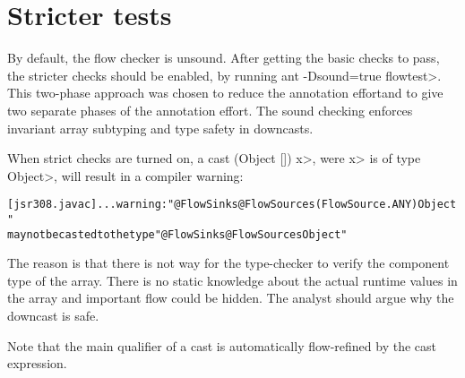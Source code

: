 %
%
%




\section{Stricter tests\label{sec:stricter}}

By default, the flow checker is unsound.  After getting the basic checks to pass, the
 stricter checks should be enabled, by running \<ant -Dsound=true flowtest>.
This two-phase approach was chosen to reduce
the annotation effortand to give two separate phases of
the annotation effort.
 The sound checking enforces invariant 
array subtyping and type safety in downcasts.


When strict checks are turned on,
a cast \<(Object []) x>, were \<x> is of type \<Object>, will result
in a compiler warning:

\begin{alltt}
[jsr308.javac] ... warning: "@FlowSinks @FlowSources({FlowSource.ANY}) Object"
       may not be casted to the type "@FlowSinks @FlowSources Object"
\end{alltt}

The reason is that there is not way for the type-checker to verify
 the component type of the array. There is no static knowledge about the actual
runtime values in the array and important flow could be hidden.
The analyst should argue why the downcast is safe.

Note that the main qualifier of a cast is automatically flow-refined
by the cast expression.


